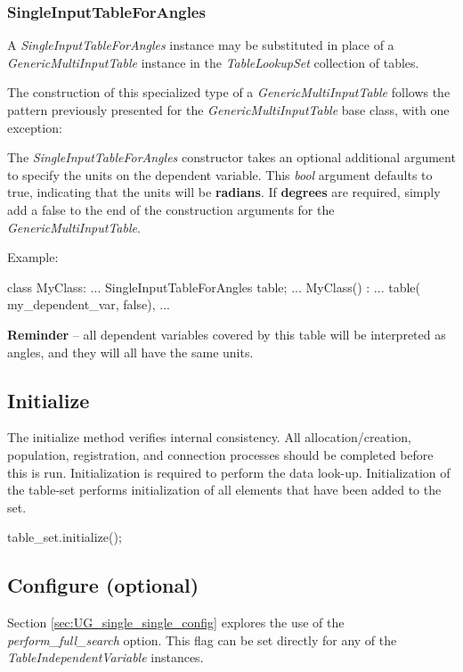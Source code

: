 \documentclass[11pt,fleqn]{report}
\begin{document}
\subsubsection{SingleInputTableForAngles}
A \textit{SingleInputTableForAngles} instance may be substituted
in place of a \textit{GenericMultiInputTable} instance in the
\textit{TableLookupSet} collection of tables.

The construction of this specialized type of a
 \textit{GenericMultiInputTable} follows
the pattern previously presented for the \textit{GenericMultiInputTable}
base class, with one exception:

The \textit{SingleInputTableForAngles} constructor takes an optional
additional argument to specify the units on the dependent variable.
This \textit{bool} argument defaults to true, indicating that the units
will be \textbf{radians}.  If \textbf{degrees} are required, simply
add a false to the end
of the construction arguments for the \textit{GenericMultiInputTable}.

Example:
\begin{code}
class MyClass:
  ...
  SingleInputTableForAngles table;
  ...
  MyClass()
    :
    ...
    table( my_dependent_var,
           false),
    ...
\end{code}

\textbf{Reminder }-- all dependent variables covered by this table will be
interpreted as angles, and they will all have the same units.

\subsection{Initialize}

The initialize method verifies internal consistency.  All allocation/creation,
 population, registration, and connection processes
 should be completed before this is run.
Initialization is required to perform the data
 look-up.  Initialization of the table-set performs
 initialization of all elements that have been added to the set.
\begin{code}
table_set.initialize();
\end{code}


\subsection{Configure (optional)}
Section \ref{sec:UG_single_single_config} explores the use of the
\textit{perform\_full\_search} option.
This flag can be set directly for any of the
\textit{TableIndependentVariable} instances.
\end{document}
